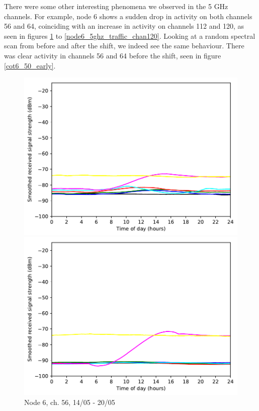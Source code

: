 \documentclass[a4paper, 11pt]{article}
\begin{document}
There were some other interesting phenomena we observed in the 5 GHz channels. For example, node 6 shows a sudden drop in activity on both channels 56 and 64, coinciding with an increase in activity on channels 112 and 120, as seen in figures \ref{node6_5ghz_traffic_chan56} to \ref{node6_5ghz_traffic_chan120}. Looking at a random spectral scan from before and after the shift, we indeed see the same behaviour. There was clear activity in channels 56 and 64 before the shift, seen in figure \ref{cot6_50_early}.
\begin{figure}[ht]
\begin{minipage}{0.47\textwidth}
	\centering
	\includegraphics[width=\textwidth]{images/5_GHz/cot-node6-student_2017-05-20_chan56_image.pdf}
	\caption{Node 6, ch. 56, 14/05 - 20/05}
	\label{node6_5ghz_traffic_chan56}
\end{minipage}\hfill
\begin{minipage}{0.47\textwidth}
	\centering
	\includegraphics[width=\textwidth]{images/5_GHz/cot-node6-student_2017-05-20_chan64_image.pdf}

\end{minipage}
\end{figure}
\end{document}
